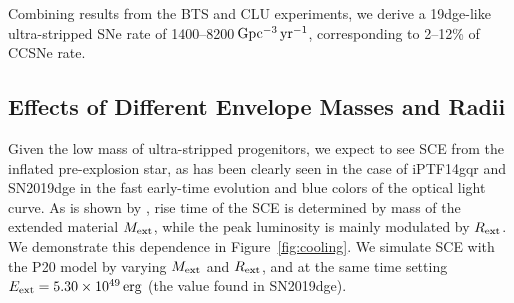 \documentclass[twocolumn]{aastex63}
\newcommand{\name}{SN2019dge}
\begin{document}
Combining results from the BTS and CLU experiments, we derive a 19dge-like ultra-stripped SNe rate of 
1400--8200\,${\rm Gpc^{-3}\,yr^{-1}}$, corresponding to 2--12\% of CCSNe rate.

\subsection{Effects of Different Envelope Masses and Radii} 
\label{subsubsec:physics}
Given the low mass of ultra-stripped progenitors, we expect to see {\color{red}SCE} from the inflated 
pre-explosion star, as has been clearly seen in the case of iPTF14gqr and SN2019dge in the 
fast early-time evolution and blue colors of the optical light curve. As is shown by 
\citet[][Fig. 2]{Nakar2014}, rise time of the {\color{red}SCE} is determined by mass of the 
extended material $M_{\rm ext}$, while the peak luminosity is mainly modulated by $R_{\rm ext}$. We 
demonstrate this dependence in Figure~\ref{fig:cooling}. We simulate {\color{red}SCE with the P20 
model} by varying $M_{\rm ext}$ and $R_{\rm ext}$, and at the same time setting {\color{red}$E_{\rm 
ext}=5.30\times 10^{49}\,{\rm erg}$} (the value found in \name). 
\end{document}
